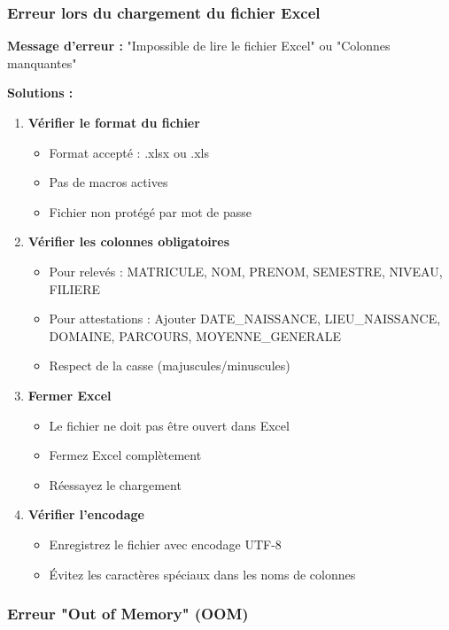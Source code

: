 \subsubsection{Erreur lors du chargement du fichier Excel}

\textbf{Message d'erreur :} "Impossible de lire le fichier Excel" ou "Colonnes manquantes"

\textbf{Solutions :}
\begin{enumerate}[leftmargin=*]
    \item \textbf{Vérifier le format du fichier}
    \begin{itemize}
        \item Format accepté : .xlsx ou .xls
        \item Pas de macros actives
        \item Fichier non protégé par mot de passe
    \end{itemize}

    \item \textbf{Vérifier les colonnes obligatoires}
    \begin{itemize}
        \item Pour relevés : MATRICULE, NOM, PRENOM, SEMESTRE, NIVEAU, FILIERE
        \item Pour attestations : Ajouter DATE\_NAISSANCE, LIEU\_NAISSANCE, DOMAINE, PARCOURS, MOYENNE\_GENERALE
        \item Respect de la casse (majuscules/minuscules)
    \end{itemize}

    \item \textbf{Fermer Excel}
    \begin{itemize}
        \item Le fichier ne doit pas être ouvert dans Excel
        \item Fermez Excel complètement
        \item Réessayez le chargement
    \end{itemize}

    \item \textbf{Vérifier l'encodage}
    \begin{itemize}
        \item Enregistrez le fichier avec encodage UTF-8
        \item Évitez les caractères spéciaux dans les noms de colonnes
    \end{itemize}
\end{enumerate}

\subsubsection{Erreur "Out of Memory" (OOM)}


